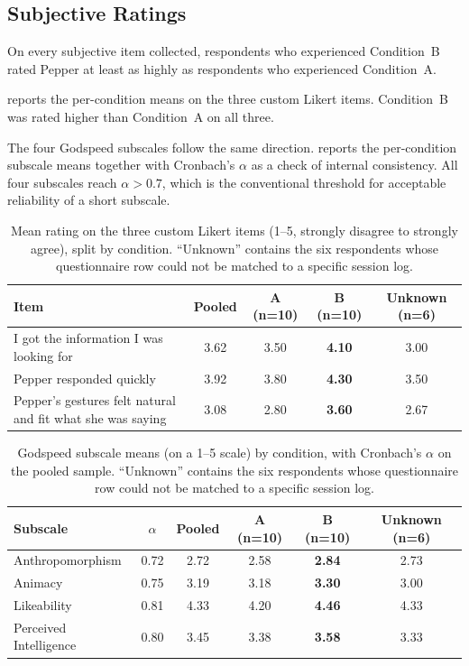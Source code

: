 \subsection{Subjective Ratings}
\label{sec:exp_subjective}

On every subjective item collected, respondents who experienced Condition~B rated Pepper at least as highly as respondents who experienced Condition~A.

 reports the per-condition means on the three custom Likert items.
Condition~B was rated higher than Condition~A on all three.

The four Godspeed subscales follow the same direction.
 reports the per-condition subscale means together with Cronbach's $\alpha$ as a check of internal consistency.
All four subscales reach $\alpha > 0.7$, which is the conventional threshold for acceptable reliability of a short subscale.

\begin{table}[h]
\centering
\small
\begin{tabular}{p{6cm} c c c c}
\hline
\textbf{Item} & \textbf{Pooled} & \textbf{A (n=10)} & \textbf{B (n=10)} & \textbf{Unknown (n=6)} \\
\hline
I got the information I was looking for                              & 3.62 & 3.50 & \textbf{4.10} & 3.00 \\
Pepper responded quickly                                              & 3.92 & 3.80 & \textbf{4.30} & 3.50 \\
Pepper's gestures felt natural and fit what she was saying            & 3.08 & 2.80 & \textbf{3.60} & 2.67 \\
\hline
\end{tabular}
\caption{Mean rating on the three custom Likert items (1--5, strongly disagree to strongly agree), split by condition. ``Unknown'' contains the six respondents whose questionnaire row could not be matched to a specific session log.}
\label{tab:custom_likert}
\end{table}



\begin{table}[h]
\centering
\small
\begin{tabular}{l c c c c c}
\hline
\textbf{Subscale} & \textbf{$\alpha$} & \textbf{Pooled} & \textbf{A (n=10)} & \textbf{B (n=10)} & \textbf{Unknown (n=6)} \\
\hline
Anthropomorphism       & 0.72 & 2.72 & 2.58 & \textbf{2.84} & 2.73 \\
Animacy                & 0.75 & 3.19 & 3.18 & \textbf{3.30} & 3.00 \\
Likeability            & 0.81 & 4.33 & 4.20 & \textbf{4.46} & 4.33 \\
Perceived Intelligence & 0.80 & 3.45 & 3.38 & \textbf{3.58} & 3.33 \\
\hline
\end{tabular}
\caption{Godspeed subscale means (on a 1--5 scale) by condition, with Cronbach's $\alpha$ on the pooled sample. ``Unknown'' contains the six respondents whose questionnaire row could not be matched to a specific session log.}
\label{tab:godspeed}
\end{table}

